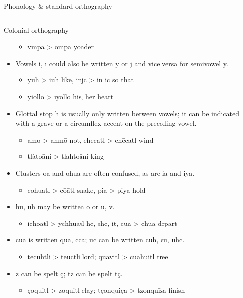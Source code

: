\documentclass[12pt]{beamer}
\newcommand{\nah}[1]{\textcolor{nahgrn}{#1}}
\newcommand{\trs}[1]{\textcolor{nahblu}{#1}}
\begin{document}
\begin{frame}
\begin{columns}[t]
\begin{column}{.22\linewidth}
\begin{block}{Phonology \& standard orthography}
\begin{threeparttable}
\begin{tablenotes}
\begin{frame}
\begin{columns}[t]
\begin{column}{.23\linewidth}
\begin{block}{Colonial orthography}
\begin{itemize}
\begin{itemize}
          \item \nah{vmpa} > \nah{ōmpa} \trs{yonder}
          \end{itemize}
        \item Vowels \nah{i}, \nah{ī} could also be written \nah{y} or \nah{j} and vice versa for semivowel \nah{y}.
          \begin{itemize}
          \item \nah{yuh} > \nah{iuh} \trs{like}, \nah{injc} > \nah{in ic} \trs{so that}
          \item \nah{yiollo} > \nah{īyōllo} \trs{his, her heart}
          \end{itemize}
        \item Glottal stop \nah{h} is usually only written between vowels; it can be indicated with  a grave or a circumflex accent on the preceding vowel.
          \begin{itemize}
          \item \nah{amo} > \nah{ahmō} \trs{not}, \nah{ehecatl} > \nah{ehēcatl} \trs{wind}
          \item \nah{tlàtoāni} > \nah{tlahtoāni} \trs{king}
          \end{itemize}
        \item Clusters \nah{oa} and \nah{ohua} are often confused, as are \nah{ia} and \nah{iya}.
          \begin{itemize}
          \item \nah{cohuatl} > \nah{cōātl} \trs{snake}, \nah{pia} > \nah{piya} \trs{hold}
          \end{itemize}
        \item \nah{hu, uh} may be written \nah{o} or \nah{u, v}.
          \begin{itemize}
          \item \nah{iehoatl} > \nah{yehhuātl} \trs{he, she, it}, \nah{eua} > \nah{ēhua} \trs{depart}
          \end{itemize}
        \item \nah{cua} is written \nah{qua, coa}; \nah{uc} can be written \nah{cuh, cu, uhc}.
          \begin{itemize}
          \item \nah{tecuhtli} > \nah{tēuctli} \trs{lord}; \nah{quavitl} > \nah{cuahuitl} \trs{tree}
          \end{itemize}
        \item \nah{z} can be spelt \nah{ç}; \nah{tz} can be spelt \nah{tç}.
          \begin{itemize}
          \item \nah{çoquitl} > \nah{zoquitl} \trs{clay}; \nah{tçonquiça} > \nah{tzonquīza} \trs{finish}

\end{itemize}
\end{itemize}
\end{block}
\end{column}
\end{columns}
\end{frame}
\end{tablenotes}
\end{threeparttable}
\end{block}
\end{column}
\end{columns}
\end{frame}
\end{document}
